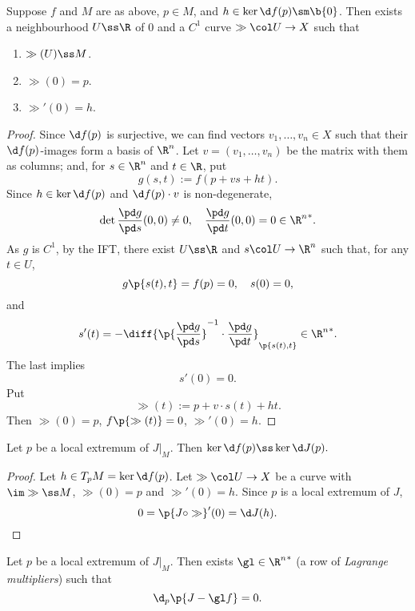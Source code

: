 \begin{lemma}
  Suppose $f$ and $M$ are as above, $p \in M$, and $h \in \ker \d f(p) \sm \b{0}$.
  Then exists a neighbourhood $U \ss \R$ of 0 and a $C^1$ curve $\gg \col U \to X$ such that
  \begin{enumerate}
    \item $\gg(U) \ss M$.
    \item $\gg(0) = p$.
    \item $\gg'(0) = h$.
  \end{enumerate} 
\end{lemma}

\begin{proof}
  Since $\d f(p)$ is surjective, we can find vectors $v_1, \dots, v_n \in X$ such that their $\d f(p)$-images form a basis of $\R^n$. Let $v = (v_1, \dots, v_n)$ be the matrix with them as columns; and, for $s \in \R^n$ and $t \in \R$, put
  $$ g(s, t) := f(p+vs+ht). $$
  Since $h \in \ker \d f(p)$ and $\d f(p) \cdot v$ is non-degenerate,
  $$ \det \frac{\pd g}{\pd s}(0, 0) \ne 0 , \quad \frac{\pd g}{\pd t}(0, 0) = 0 \in {\R^n}^*. $$
  As $g$ is $C^1$, by the IFT, there exist $U \ss \R$ and $s \col U \to \R^n$ such that, for any $t \in U$,
  $$ g\p{s(t), t} = f(p) = 0, \quad s(0) = 0, $$
  and
  $$ s'(t) = -  \diff{\p{\frac{\pd g}{\pd s}}^{-1} \cdot \frac{\pd g}{\pd t}}_{\p{s(t), t}} \in {\R^n}^*. $$
  The last implies
  $$ s'(0) = 0. $$
  Put
  $$ \gg(t) := p+v \cdot s(t)+ht. $$
  Then $\gg(0) = p$, $f\p{\gg(t)} = 0$, $\gg'(0) = h$.
\end{proof}

\begin{lemma}
  Let $p$ be a local extremum of $J|_M$.
  Then $\ker \d f(p) \ss \ker \d J(p).$
\end{lemma}

\begin{proof}
  Let $h \in T_pM = \ker \d f(p)$.
  Let $\gg \col U \to X$ be a curve with $\im \gg \ss M$, $\gg(0) = p$ and $\gg'(0) = h$.
  Since $p$ is a local extremum of $J$,
  $$ 0 = \p{J \circ \gg}'(0) = \d J(h). $$
\end{proof}

\begin{theorem}
  Let $p$ be a local extremum of $J|_M$.
  Then exists $\gl \in {\R^{n}}^*$ (a row of \emph{Lagrange multipliers}) such that
  $$ \d_p \p{J-\gl f} = 0. $$
\end{theorem}


